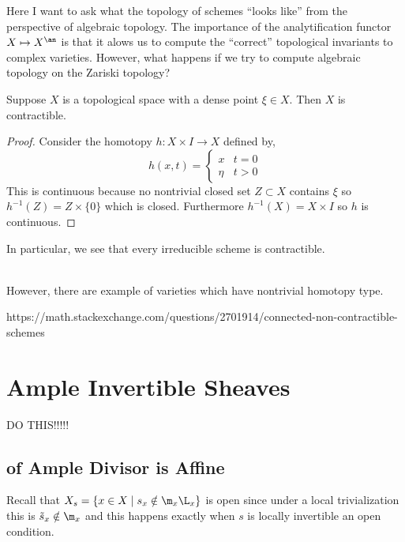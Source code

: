 \documentclass[12pt]{article}
\begin{document}
Here I want to ask what the topology of schemes ``looks like'' from the perspective of algebraic topology. The importance of the analytification functor $X \mapsto X^\an$ is that it alows us to compute the ``correct'' topological invariants to complex varieties. However, what happens if we try to compute algebraic topology on the Zariski topology?

\begin{lemma}
Suppose $X$ is a topological space with a dense point $\xi \in X$. Then $X$ is contractible.
\end{lemma}

\begin{proof}
Consider the homotopy $h : X \times I \to X$ defined by,
\[ h(x, t) = 
\begin{cases}
x & t = 0
\\
\eta & t > 0
\end{cases} \]
This is continuous because no nontrivial closed set $Z \subset X$ contains $\xi$ so $h^{-1}(Z) = Z \times \{ 0 \}$ which is closed. Furthermore $h^{-1}(X) = X \times I$ so $h$ is continuous. 
\end{proof}

\begin{rmk}
In particular, we see that every irreducible scheme is contractible. 
\end{rmk}
\noindent\\
However, there are example of varieties which have nontrivial homotopy type. 

\begin{example}
https://math.stackexchange.com/questions/2701914/connected-non-contractible-schemes
\end{example}

\section{Ample Invertible Sheaves}

DO THIS!!!!!

\subsection{ of Ample Divisor is Affine}

\begin{rmk}
Recall that $X_s = \{ x \in X \mid s_x \notin \m_x \L_x \}$ is open since under a local trivialization this is $\tilde{s}_x \notin \m_x$ and this happens exactly when $s$ is locally invertible an open condition.
\end{rmk}
\end{document}
